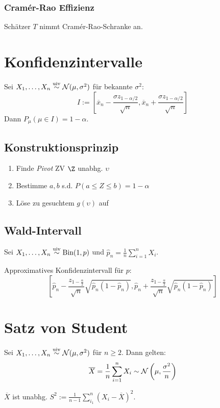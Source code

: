 \subsubsection*{Cram\'er-Rao Effizienz}

Schätzer \(T\) nimmt Cram\'er-Rao-Schranke an.

\section*{Konfidenzintervalle}

Sei \(X_1,\dots,X_n \stackrel{\text{uiv}}{\sim} \mathcal{N}(\mu,\sigma^2)\) für bekannte \(\sigma^2\):
\[ I := \left[ \overline x_n - \frac{\sigma z_{1-\alpha/2}}{\sqrt{n}}, \overline x_n + \frac{\sigma z_{1-\alpha/2}}{\sqrt{n}} \right] \]
Dann \(P_\mu(\mu \in I) = 1-\alpha\).

\subsection*{Konstruktionsprinzip}

\begin{enumerate}
	\item Finde \emph{Pivot} ZV \(\Z\) unabhg. \(\upsilon\)
	\item Bestimme \(a, b\) s.d. \(P(a \leq Z \leq b) = 1-\alpha\)
	\item Löse zu gesuchtem \(g(\upsilon)\) auf
\end{enumerate}

\subsection*{Wald-Intervall}

Sei \(X_1,\dots,X_n \stackrel{\text{uiv}}{\sim} \text{Bin}(1,p)\) und \(\hat p_n = \frac{1}{n}\sum_{i=1}^n X_i\).

Approximatives Konfidenzintervall für \(p\):
\[ \left[\hat p_n - \frac{z_{1-\frac{\alpha}{2}}}{\sqrt{n}} \sqrt{\hat p_n (1-\hat p_n)}, \hat p_n + \frac{z_{1-\frac{\alpha}{2}}}{\sqrt{n}} \sqrt{\hat p_n (1-\hat p_n)}\right] \]

\section*{Satz von Student}

Sei \(X_1,\dots,X_n \stackrel{\text{uiv}}{\sim} \mathcal{N}(\mu,\sigma^2)\) für \(n \geq 2\). Dann gelten:
\[ \overline X = \frac{1}{n}\sum_{i=1}^n X_i \sim \mathcal{N}\left(\mu,\frac{\sigma^2}{n}\right) \]

\(\overline X\) ist unabhg. \(S^2 := \frac{1}{n-1} \sum_{i_1}^n (X_i-\overline X)^2\).

